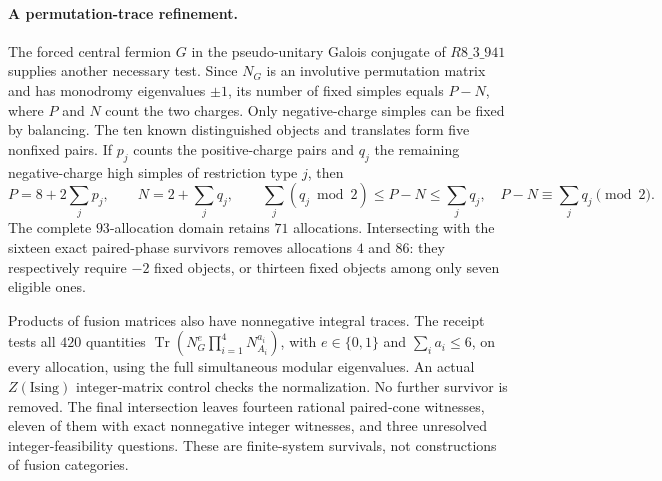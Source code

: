 \paragraph{A permutation-trace refinement.}
The forced central fermion $G$ in the pseudo-unitary Galois conjugate of
$R8\_3\_941$ supplies another necessary test.  Since $N_G$ is an
involutive permutation matrix and has monodromy eigenvalues $\pm1$, its
number of fixed simples equals $P-N$, where $P$ and $N$ count the two
charges.  Only negative-charge simples can be fixed by balancing.
The ten known distinguished objects and translates form five nonfixed
pairs.  If $p_j$ counts the positive-charge pairs and $q_j$ the remaining
negative-charge high simples of restriction type $j$, then
\[
 P=8+2\sum_jp_j,\qquad N=2+\sum_jq_j,
 \qquad
 \sum_j(q_j\bmod2)\le P-N\le\sum_jq_j,
 \quad P-N\equiv\sum_jq_j\pmod2.
\]
The complete $93$-allocation domain retains $71$ allocations.  Intersecting
with the sixteen exact paired-phase survivors removes allocations $4$
and $86$: they respectively require $-2$ fixed objects, or thirteen
fixed objects among only seven eligible ones.

Products of fusion matrices also have nonnegative integral traces.  The
receipt tests all $420$ quantities
$\operatorname{Tr}(N_G^e\prod_{i=1}^4N_{A_i}^{a_i})$, with
$e\in\{0,1\}$ and $\sum_i a_i\le6$, on every allocation, using the
full simultaneous modular eigenvalues.  An actual $Z(\mathrm{Ising})$
integer-matrix control checks the normalization.  No further survivor is
removed.  The final intersection leaves fourteen rational paired-cone
witnesses, eleven of them with exact nonnegative integer witnesses, and
three unresolved integer-feasibility questions.  These are finite-system
survivals, not constructions of fusion categories.
